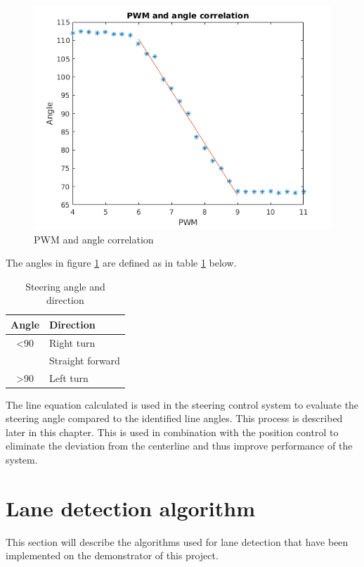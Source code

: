 \begin{figure}[H]
  \includegraphics[width=\textwidth]{./img/PWMPLOT_2.png}
  \centering
  \caption{PWM and angle correlation}
  \label{fig:PWM and angle correlation}
\end{figure}

The angles in figure \ref{fig:PWM and angle correlation} are defined as in table \ref{Steering angle and direction} below.

\begin{table}[H]
\centering
\caption{Steering angle and direction}
\label{Steering angle and direction}
\begin{tabular}{@{} cl @{}}
\toprule
Angle		& Direction \\ 
\midrule
 \textless 90		& Right turn \\ 
  \: 90		& Straight forward \\ 
 \textgreater 90		& Left turn \\ 
\bottomrule
 \end{tabular}
\end{table}


The line equation calculated is used in the steering control system to evaluate the steering angle compared to the identified line angles. This process is described later in this chapter. This is used in combination with the position control to eliminate the deviation from the centerline and thus improve performance of the system.


\section{Lane detection algorithm}
This section will describe the algorithms used for lane detection that have been implemented on the demonstrator of this project.\\

